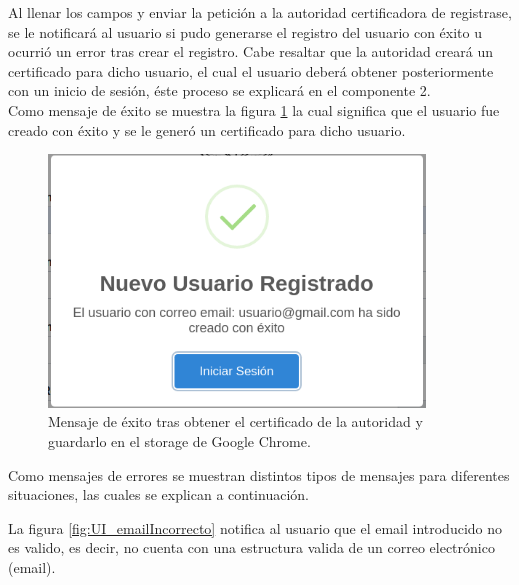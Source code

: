 \documentclass[12pt, a4paper, titlepage]{report}
\begin{document}
    			Al llenar los campos y enviar la petición a la autoridad certificadora de registrase, se le notificará al usuario si pudo generarse el registro del usuario con éxito u ocurrió un error tras crear el registro. Cabe resaltar que la autoridad creará un certificado para dicho usuario, el cual el usuario deberá obtener posteriormente con un inicio de sesión, éste proceso se explicará en el componente 2.\\
    			
    			Como mensaje de éxito se muestra la figura \ref{fig:UI_nuevoUsuarioRegistrado} la cual significa que el usuario fue creado con éxito y se le generó un certificado para dicho usuario.
    			
    			\begin{figure}[H]
    				\begin{center}	\includegraphics[width=10cm]{./imagenes/Disenio/Componente_1/UI_nuevoUsuarioRegistrado.PNG}
    					\caption[Mensaje de éxito]{Mensaje de éxito tras obtener el certificado de la autoridad y guardarlo en el storage de Google Chrome.}
    				\label{fig:UI_nuevoUsuarioRegistrado}
    				\end{center}
    			\end{figure}
    			
    			Como mensajes de errores se muestran distintos tipos de mensajes para diferentes situaciones, las cuales se explican a continuación.
    			
    			La figura \ref{fig:UI_emailIncorrecto} notifica al usuario que el email introducido no es valido, es decir, no cuenta con una estructura valida de un correo electrónico (email).
    			
\end{document}
